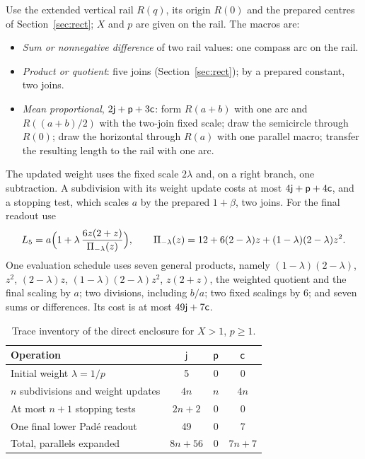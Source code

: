 Use the extended vertical rail $R(q)$, its origin $R(0)$ and the prepared centres of
Section~\ref{sec:rect}; $X$ and $p$ are given on the rail. The macros are:
\begin{itemize}
\item \emph{Sum or nonnegative difference} of two rail values: one compass arc on the rail.
\item \emph{Product or quotient}: five joins (Section~\ref{sec:rect}); by a prepared constant, two joins.
\item \emph{Mean proportional}, $2\mathsf{j}+\mathsf{p}+3\mathsf{c}$: form $R(a+b)$ with one arc and $R((a+b)/2)$ with the
  two-join fixed scale; draw the semicircle through $R(0)$; draw the horizontal through $R(a)$ with one
  parallel macro; transfer the resulting length to the rail with one arc.
\end{itemize}
The updated weight uses the fixed scale $2\lambda$ and, on a right branch, one subtraction. A
subdivision with its weight update costs at most $4\mathsf{j}+\mathsf{p}+4\mathsf{c}$, and a stopping test, which scales $a$
by the prepared $1+\beta$, two joins. For the final readout use
\begin{equation}\label{eq:L5eval}
L_5=a\Bigl(1+\lambda\,\frac{6z(2+z)}{\Pi_{-\lambda}(z)}\Bigr),\qquad
\Pi_{-\lambda}(z)=12+6(2-\lambda)z+(1-\lambda)(2-\lambda)z^{2}.
\end{equation}
One evaluation schedule uses seven general products, namely $(1-\lambda)(2-\lambda)$, $z^{2}$,
$(2-\lambda)z$, $(1-\lambda)(2-\lambda)z^{2}$, $z(2+z)$, the weighted quotient and the final scaling by
$a$; two divisions, including $b/a$; two fixed scalings by $6$; and seven sums or differences. Its cost
is at most $49\mathsf{j}+7\mathsf{c}$.

\begin{table}[htbp]
\centering\small
\caption{Trace inventory of the direct enclosure for $X>1$, $p\ge1$.}\label{tab:subdiv}
\begin{tabular}{@{}lccc@{}}
\toprule
Operation & $\mathsf{j}$ & $\mathsf{p}$ & $\mathsf{c}$\\
\midrule
Initial weight $\lambda=1/p$ & 5 & 0 & 0\\
$n$ subdivisions and weight updates & $4n$ & $n$ & $4n$\\
At most $n+1$ stopping tests & $2n+2$ & 0 & 0\\
One final lower Pad\'e readout & 49 & 0 & 7\\
\midrule
Total, parallels expanded & $8n+56$ & 0 & $7n+7$\\
\bottomrule
\end{tabular}
\end{table}

